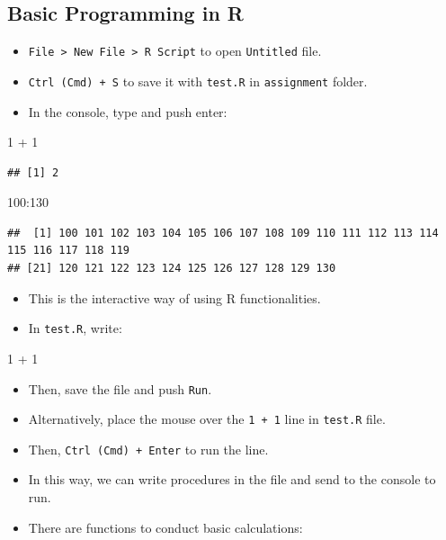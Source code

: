 \documentclass[
]{book}
\newenvironment{Shaded}{\begin{snugshade}}{\end{snugshade}}
\newcommand{\DecValTok}[1]{\textcolor[rgb]{0.00,0.00,0.81}{#1}}
\newcommand{\SpecialCharTok}[1]{\textcolor[rgb]{0.00,0.00,0.00}{#1}}
\providecommand{\tightlist}{%
  \setlength{\itemsep}{0pt}\setlength{\parskip}{0pt}}
\begin{document}
\hypertarget{basic-programming-in-r}{%
\subsection{Basic Programming in R}\label{basic-programming-in-r}}

\begin{itemize}
\tightlist
\item
  \texttt{File\ \textgreater{}\ New\ File\ \textgreater{}\ R\ Script} to open \texttt{Untitled} file.
\item
  \texttt{Ctrl\ (Cmd)\ +\ S} to save it with \texttt{test.R} in \texttt{assignment} folder.
\item
  In the console, type and push enter:
\end{itemize}

\begin{Shaded}
\begin{Highlighting}[]
\DecValTok{1} \SpecialCharTok{+} \DecValTok{1}
\end{Highlighting}
\end{Shaded}

\begin{verbatim}
## [1] 2
\end{verbatim}

\begin{Shaded}
\begin{Highlighting}[]
\DecValTok{100}\SpecialCharTok{:}\DecValTok{130}
\end{Highlighting}
\end{Shaded}

\begin{verbatim}
##  [1] 100 101 102 103 104 105 106 107 108 109 110 111 112 113 114 115 116 117 118 119
## [21] 120 121 122 123 124 125 126 127 128 129 130
\end{verbatim}

\begin{itemize}
\tightlist
\item
  This is the interactive way of using R functionalities.
\item
  In \texttt{test.R}, write:
\end{itemize}

\begin{Shaded}
\begin{Highlighting}[]
\DecValTok{1} \SpecialCharTok{+} \DecValTok{1}
\end{Highlighting}
\end{Shaded}

\begin{itemize}
\item
  Then, save the file and push \texttt{Run}.
\item
  Alternatively, place the mouse over the \texttt{1\ +\ 1} line in \texttt{test.R} file.
\item
  Then, \texttt{Ctrl\ (Cmd)\ +\ Enter} to run the line.
\item
  In this way, we can write procedures in the file and send to the console to run.
\item
  There are functions to conduct basic calculations:
\end{itemize}
\end{document}
